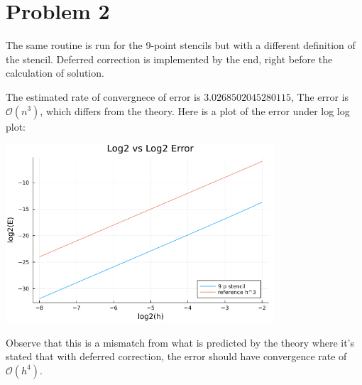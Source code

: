 \documentclass[]{article}
\begin{document}
\section*{Problem 2}
    \hspace{1.1em}
    The same routine is run for the 9-point stencils but with a different definition of the stencil. Deferred correction is implemented by the end, right before the calculation of solution. 
    \par 
    The estimated rate of convergnece of error is $3.0268502045280115$, The error is $\mathcal{O}(n^3)$, which differs from the theory. Here is a plot of the error under log log plot: 
    \begin{center}
        \includegraphics[width=10cm]{p2_fig.png}
    \end{center}
    Observe that this is a mismatch from what is predicted by the theory where it's stated that with deferred correction, the error should have convergence rate of $\mathcal{O}(h^4)$. 

        
\end{document}
